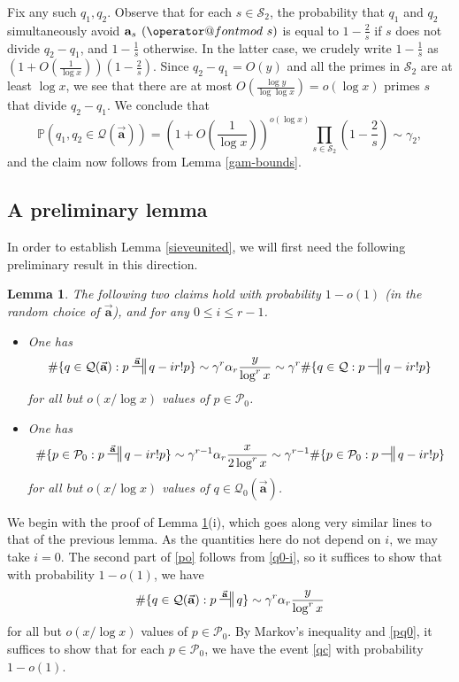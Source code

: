 \documentclass[11pt]{amsart}
\makeatletter
\numberwithin{equation}{section}  %
\theoremstyle{remark}
\theoremstyle{plain}
\newtheorem{lem}{Lemma}[section]
\numberwithin{equation}{section}
\newcommand{\PR}{\mathbb{P}}  %
\renewcommand{\pmod}[1]{\allowbreak\mkern7mu({\operator@font mod}\,\,#1)}
\renewcommand{\leq}{\leqslant}
\renewcommand{\(}{\left(}
\renewcommand{\)}{\right)}
\newcommand{\pfrac}[2]{\left(\frac{#1}{#2}\right)}  %
\newcommand{\asym}{\sim}   %
\newcommand{\relr}{\nsdtstile{}{}} %
\newcommand{\relra}{\nsdtstile{}{\vect{\mathbf{a}}}} %
\newcommand{\vect}[1]{{\ensuremath{\vec{#1}}}}
\newcommand{\PP}{\mathcal{P}}
\newcommand{\QQ}{\mathcal{Q}}
\newcommand{\cS}{\mathcal{S}}
\makeatother
\begin{document}
Fix any such $q_1,q_2$.  Observe that for each $s \in \cS_2$, the probability that $q_1$ and $q_2$ simultaneously avoid $\mathbf{a}_s \pmod{s}$ is equal to $1-\frac{2}{s}$ if $s$ does not divide $q_2-q_1$, and $1-\frac{1}{s}$ otherwise.  In the latter case, we crudely write $1-\frac{1}{s}$ as $(1 + O(\frac{1}{\log x})) (1-\frac{2}{s})$.  Since $q_2-q_1 = O(y)$ and all the primes in $\cS_2$ are at least $\log x$, we see that there are at most $O(\frac{\log y}{\log \log x}) = o(\log x)$ primes $s$ that divide $q_2-q_1$.  We conclude that
$$ \PR( q_1,q_2 \in \QQ(\vect{\mathbf{a}}) ) = \left(1 +
O\pfrac{1}{\log x}\right)^{o(\log x)} \prod_{s \in \cS_2}
\left(1-\frac{2}{s}\right) \asym \gamma_2,$$
and the claim now follows from Lemma \ref{gam-bounds}.

\subsection{A preliminary lemma}

In order to establish Lemma \ref{sieveunited}, we will first need the following preliminary result in this direction.

\begin{lem}\label{QQ1p-normal}  The following two claims hold with probability $1-o(1)$ (in the random choice of $\vect{\mathbf{a}}$), and for any $0 \leq i \leq r-1$.
\begin{itemize}
\item[(i)]  One has
\begin{equation}\label{po}
\# \{ q \in \QQ(\vect{\mathbf{a}}): p \relra q - ir! p \} \asym \gamma^r \alpha_r \frac{y}{\log^r x} \asym \gamma^r \# \{ q \in \QQ: p \relr q-ir! p \}
\end{equation}
for all but $o(x/\log x)$ values of $p \in \PP_0$.
\item[(ii)] One has
\begin{equation}\label{qo}
 \# \{ p \in \PP_0: p \relra q - ir! p \} \asym \gamma^{r-1} \alpha_r \frac{x}{2\log^r x} \asym \gamma^{r-1} \# \{ p \in \PP_0: p \relr q-ir! p \}
\end{equation}
for all but $o(x/\log x)$ values of $q \in \QQ_0(\vect{\mathbf{a}})$.
\end{itemize}
\end{lem}

We begin with the proof of Lemma \ref{QQ1p-normal}(i), which goes along very similar lines to that of the previous lemma.  As the quantities here do not depend on $i$, we may take $i=0$.  The second part of \eqref{po} follows from \eqref{q0-i}, so it suffices to show that with probability $1-o(1)$, we have
\begin{equation}\label{qc}
\# \{ q \in \QQ(\vect{\mathbf{a}}): p \relra q \} \asym \gamma^r \alpha_r \frac{y}{\log^r x}
\end{equation}
for all but $o(x/\log x)$ values of $p \in \PP_0$.  By Markov's inequality and \eqref{pq0}, it suffices to show that for each $p \in \PP_0$, we have the event \eqref{qc} with probability $1-o(1)$. 
\end{document}
